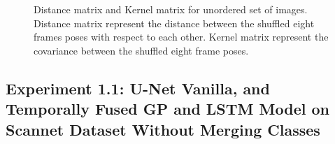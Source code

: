 	\begin{figure}
		\centering
		\qquad
		\caption{Distance matrix and Kernel matrix for unordered set of images. Distance matrix represent the distance between the shuffled eight frames poses with respect to each other. Kernel matrix represent the covariance between the shuffled eight frame poses.}%
		\label{fig:unordered_D_and_K}%
	\end{figure}
	

    \subsection{Experiment 1.1: U-Net Vanilla, and Temporally Fused GP and LSTM Model on Scannet Dataset Without Merging Classes}
    
